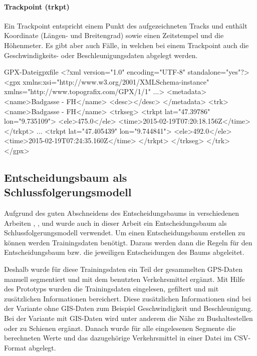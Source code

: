 \paragraph{Trackpoint (trkpt)}
Ein Trackpoint entspricht einem Punkt des aufgezeichneten Tracks und enthält Koordinate (Längen- und Breitengrad) sowie einen Zeitstempel und die Höhenmeter. Es gibt aber auch Fälle, in welchen bei einem Trackpoint auch die Geschwindigkeits- oder Beschleunigungsdaten abgelegt werden.
 
\begin{code}[xml]{GPX-Datei}{gpxfile}
<?xml version="1.0" encoding="UTF-8" standalone="yes"?>
<gpx xmlns:xsi="http://www.w3.org/2001/XMLSchema-instance" xmlns="http://www.topografix.com/GPX/1/1" ...>
    <metadata>
        <name>Badgasse - FH</name>
        <desc></desc>
    </metadata>
    <trk>
        <name>Badgasse - FH</name>
        <trkseg>
            <trkpt lat="47.39786" lon="9.735109">
                <ele>475.0</ele>
                <time>2015-02-19T07:20:18.156Z</time>
            </trkpt>
            ...
            <trkpt lat="47.405439" lon="9.744841">
                <ele>492.0</ele>
                <time>2015-02-19T07:24:35.160Z</time>
            </trkpt>
        </trkseg>
    </trk>
</gpx>
\end{code}
\clearpage

\subsection{Entscheidungsbaum als Schlussfolgerungsmodell}
\label{entscheidungsbaumAlsSchlussfolgerungsmodell}
Aufgrund des guten Abschneidens des Entscheidungsbaums in verschiedenen Arbeiten  \cite{stenneth_transportation_2011}, \cite{reddy_using_2010}, \cite{sebastian_nagel_moglichkeitsstudie_2011}und \cite{zheng_learning_2008} wurde auch in dieser Arbeit ein Entscheidungsbaum als Schlussfolgerungsmodell verwendet. Um einen Entscheidungsbaum erstellen zu können werden Trainingsdaten benötigt. Daraus werden dann die Regeln für den Entscheidungsbaum bzw. die jeweiligen Entscheidungen des Baums abgeleitet.

Deshalb wurde für diese Trainingsdaten ein Teil der gesammelten GPS-Daten manuell segmentiert und mit dem benutzten Verkehrsmittel ergänzt. Mit Hilfe des Prototyps wurden die Trainingsdaten eingelesen, gefiltert und mit zusätzlichen Informationen bereichert. Diese zusätzlichen Informationen sind bei der Variante ohne GIS-Daten zum Beispiel Geschwindigkeit und Beschleunigung. Bei der Variante mit GIS-Daten wird unter anderem die Nähe zu Bushaltestellen oder zu Schienen ergänzt. Danach wurde für alle eingelesenen Segmente die berechneten Werte und das dazugehörige Verkehrsmittel in einer Datei im CSV-Format abgelegt. 


